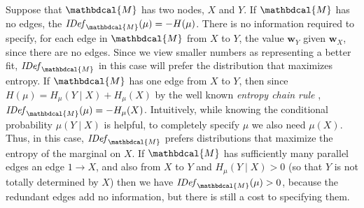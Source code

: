\documentclass{article}
\theoremstyle{plain}
\theoremstyle{definition}
\theoremstyle{remark}
\let\H\relax
\DeclareMathOperator{\H}{\mathrm{H}} %
\newcommand\mat[1]{\mathbf{#1}}
\newcommand{\dg}[1]{\mathbdcal{#1}}
\newcommand{\IBal}[1]{\mathit{IDef}_{#1}}
\numberwithin{equation}{section}
\begin{document}
Suppose that $\dg M$ has two nodes, $X$ and $Y$.  
If $\dg M$ has no edges, the $\IBal{\dg M}(\mu) = - H(\mu)$.
There is no information required to specify, for each edge in ${\dg
  M}$ from $X$ to
$Y$, the value ${\mat w}_Y$ given ${\mat w}_X$, since there are no
edges.
Since we view smaller numbers as representing a better fit,
$\IBal{\dg M}$ in this case will prefer the distribution that
maximizes entropy.
If $\dg M$ has one edge from $X$ to $Y$, then since
$H(\mu) = H_{\mu}(Y \mid X) + H_\mu(X)$ by the well known 
\emph{entropy chain rule} \cite{mackay2003information},
$\IBal{\dg   M}(\mu) = -H_{\mu}(X)$.
Intuitively, while knowing the conditional probability $\mu(Y \mid X)$
is helpful, to completely specify $\mu$ we also need 
$\mu(X)$.     Thus, in this case, $\IBal{\dg
  M}$ prefers distributions that maximize the entropy of 
the marginal on $X$.
If $\dg M$ has  
 sufficiently many parallel edges
an edge $1 \to X$, and also 
 from $X$ to $Y$
 and $H_{\mu}(Y \mid X) > 0$ 
(so that $Y$ is not totally determined by $X$)
then we have $\IBal{\dg M}(\mu) > 0$, because the redundant edges add no
information, but there is still a cost to specifying them.
\end{document}
